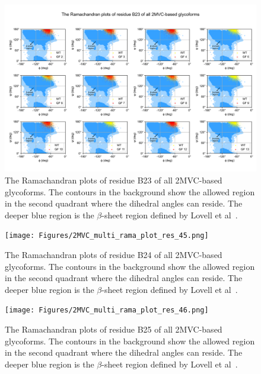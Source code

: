 \documentclass[sn-vancouver]{sn-jnl}
\begin{document}
\renewcommand{\thefigure}{S\arabic{figure}}
\begin{figure}[H]
\centering
\includegraphics[width=\textwidth]{Figures/2MVC_multi_rama_plot_res_44.png}
\caption{The Ramachandran plots of residue B23 of all 2MVC-based glycoforms. The contours in the background show the allowed region in the second quadrant where the dihedral angles can reside. The deeper blue region is the $\beta$-sheet region defined by Lovell et al~\cite{lovell2003structure}.}
\end{figure}

\renewcommand{\thefigure}{S\arabic{figure}}
\begin{figure}[H]
\centering
\texttt{[image: Figures/2MVC\_multi\_rama\_plot\_res\_45.png]}
\caption{The Ramachandran plots of residue B24 of all 2MVC-based glycoforms. The contours in the background show the allowed region in the second quadrant where the dihedral angles can reside. The deeper blue region is the $\beta$-sheet region defined by Lovell et al~\cite{lovell2003structure}.}
\end{figure}

\renewcommand{\thefigure}{S\arabic{figure}}
\begin{figure}[H]
\centering
\texttt{[image: Figures/2MVC\_multi\_rama\_plot\_res\_46.png]}
\caption{The Ramachandran plots of residue B25 of all 2MVC-based glycoforms. The contours in the background show the allowed region in the second quadrant where the dihedral angles can reside. The deeper blue region is the $\beta$-sheet region defined by Lovell et al~\cite{lovell2003structure}.}
\end{figure}
\end{document}
